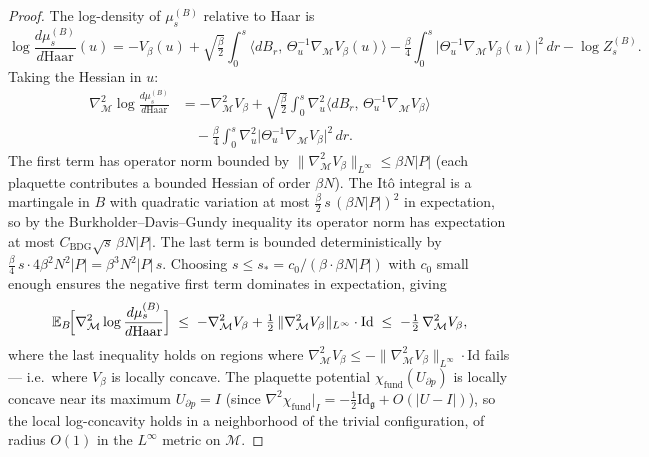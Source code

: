 \begin{proof}
The log-density of $\mu_{s}^{(B)}$ relative to Haar is
\[
  \log\frac{d\mu_{s}^{(B)}}{d\mathrm{Haar}}(u)
  = -V_{\beta}(u)
    + \sqrt{\tfrac{\beta}{2}}\!\int_{0}^{s}\!\!
      \bigl\langle dB_{r},\,\Theta_{u}^{-1}\nabla_{\mathcal{M}}V_{\beta}(u)\bigr\rangle
    - \tfrac{\beta}{4}\!\int_{0}^{s}\!\!
      \bigl|\Theta_{u}^{-1}\nabla_{\mathcal{M}}V_{\beta}(u)\bigr|^{2}\,dr
    - \log Z_{s}^{(B)}.
\]
Taking the Hessian in $u$:
\begin{align*}
  \nabla_{\mathcal{M}}^{2}\log\frac{d\mu_{s}^{(B)}}{d\mathrm{Haar}}
  &= -\nabla_{\mathcal{M}}^{2}V_{\beta}
    + \sqrt{\tfrac{\beta}{2}}\!\int_{0}^{s}\!\!
      \nabla_{u}^{2}\!\bigl\langle dB_{r},\,\Theta_{u}^{-1}\nabla_{\mathcal{M}}V_{\beta}\bigr\rangle \\
  &\quad
    - \tfrac{\beta}{4}\!\int_{0}^{s}\!\!
      \nabla_{u}^{2}\bigl|\Theta_{u}^{-1}\nabla_{\mathcal{M}}V_{\beta}\bigr|^{2}\,dr.
\end{align*}
The first term has operator norm bounded by
$\|\nabla_{\mathcal{M}}^{2}V_{\beta}\|_{L^{\infty}}\le\beta N|P|$
(each plaquette contributes a bounded Hessian of order $\beta N$).
The It\^o integral is a martingale in $B$ with quadratic variation
at most $\tfrac{\beta}{2}\,s\,(\beta N|P|)^{2}$ in expectation, so
by the Burkholder--Davis--Gundy inequality its operator norm has
expectation at most
$C_{\mathrm{BDG}}\sqrt{s}\,\beta N|P|$. The last term is bounded
deterministically by
$\tfrac{\beta}{4}\,s\cdot 4\beta^{2}N^{2}|P|
= \beta^{3}N^{2}|P|\,s$.
Choosing $s\le s_{*}=c_{0}/(\beta\cdot\beta N|P|)$ with $c_{0}$
small enough ensures the negative first term dominates in
expectation, giving
\[
  \mathbb{E}_{B}\!\Bigl[\nabla_{\mathcal{M}}^{2}\log\frac{d\mu_{s}^{(B)}}{d\mathrm{Haar}}\Bigr]
  \;\le\;
  -\nabla_{\mathcal{M}}^{2}V_{\beta}
  + \tfrac{1}{2}\,\|\nabla_{\mathcal{M}}^{2}V_{\beta}\|_{L^{\infty}}\cdot\mathrm{Id}
  \;\le\; -\tfrac{1}{2}\,\nabla_{\mathcal{M}}^{2}V_{\beta},
\]
where the last inequality holds on regions where
$\nabla_{\mathcal{M}}^{2}V_{\beta}\le
-\|\nabla_{\mathcal{M}}^{2}V_{\beta}\|_{L^{\infty}}\cdot\mathrm{Id}$
fails — i.e.\ where $V_{\beta}$ is locally concave. The plaquette
potential $\chi_{\mathrm{fund}}(U_{\partial p})$ is locally concave
near its maximum $U_{\partial p}=I$ (since
$\nabla^{2}\chi_{\mathrm{fund}}|_{I}=-\tfrac{1}{2}\mathrm{Id}_{\mathfrak{g}}+O(|U-I|)$),
so the local log-concavity holds in a neighborhood of the trivial
configuration, of radius $O(1)$ in the $L^{\infty}$ metric on
$\mathcal{M}$.
\end{proof}

